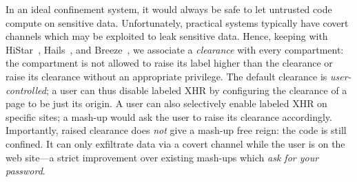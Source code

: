 In an ideal confinement system, it would always be safe to let untrusted
code compute on sensitive data.
%
Unfortunately, practical systems typically have covert channels which
may be exploited to leak sensitive data.
%
Hence, keeping with HiStar~\cite{Zeldovich:2006},
Hails~\cite{giffin:2012:hails}, and Breeze~\cite{Breeze13}, we associate
a \emph{clearance} with every compartment: the compartment is not
allowed to raise its label higher than the clearance or raise its
clearance without an appropriate privilege.
%
The default clearance is \emph{user-controlled}; a user can thus disable
labeled XHR by configuring the clearance of a page to be just
its origin.
%
A user can also selectively enable labeled XHR on specific sites; a
mash-up would ask the user to raise its clearance accordingly.
%
Importantly, raised clearance does \emph{not} give a mash-up free reign:
the code is still confined.
%
It can only exfiltrate data via a covert channel while the user
is on the web site---a strict improvement over existing mash-ups which
\emph{ask for your password}.

